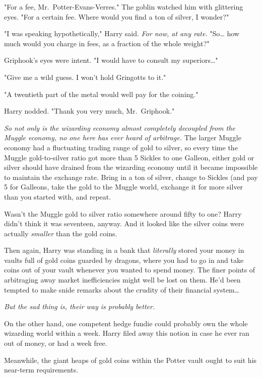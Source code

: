 "For a fee, Mr.~Potter-Evans-Verres." The goblin watched him with glittering 
eyes. "For a certain fee. Where would you find a ton of silver, I wonder?"

"I was speaking hypothetically," Harry said. \emph{For now, at any rate.} 
"So{\ldots} how much would you charge in fees, as a fraction of the whole 
weight?"

Griphook's eyes were intent. "I would have to consult my superiors{\ldots}"

"Give me a wild guess. I won't hold Gringotts to it."

"A twentieth part of the metal would well pay for the coining."

Harry nodded. "Thank you very much, Mr.~Griphook."

\emph{So not only is the wizarding economy almost completely decoupled from the 
Muggle economy, no one here has ever heard of arbitrage.} The larger Muggle 
economy had a fluctuating trading range of gold to silver, so every time the 
Muggle gold-to-silver ratio got more than 5%
Sickles to one Galleon, either gold or silver should have drained from the 
wizarding economy until it became impossible to maintain the exchange rate. 
Bring in a ton of silver, change to Sickles (and pay 5%
for Galleons, take the gold to the Muggle world, exchange it for more silver 
than you started with, and repeat.

Wasn't the Muggle gold to silver ratio somewhere around fifty to one? Harry 
didn't think it was seventeen, anyway. And it looked like the silver coins were 
actually \emph{smaller} than the gold coins.

Then again, Harry was standing in a bank that \emph{literally} stored your 
money in vaults full of gold coins guarded by dragons, where you had to go in 
and take coins out of your vault whenever you wanted to spend money. The finer 
points of arbitraging away market inefficiencies might well be lost on them. 
He'd been tempted to make snide remarks about the crudity of their financial 
system{\ldots}

\emph{But the sad thing is, their way is probably better.}

On the other hand, one competent hedge fundie could probably own the whole 
wizarding world within a week. Harry filed away this notion in case he ever ran 
out of money, or had a week free.

Meanwhile, the giant heaps of gold coins within the Potter vault ought to suit 
his near-term requirements.

